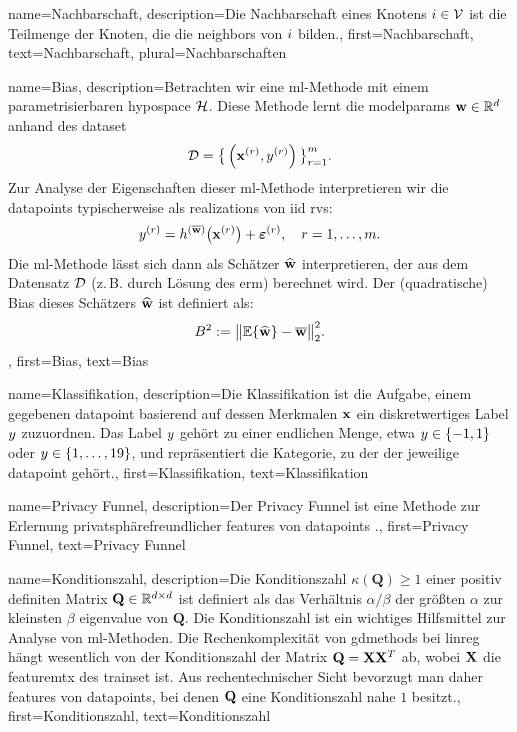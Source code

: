 {{{
{
	name={Nachbarschaft},
	description={Die  Nachbarschaft eines Knotens $i \in \mathcal{V}$ 
		ist die Teilmenge der Knoten, die die \gls{neighbors} von $i$ bilden.},
	first={Nachbarschaft}, text={Nachbarschaft}, plural={Nachbarschaften}
}

{
	name={Bias},
	description={Betrachten wir eine  \gls{ml}-Methode mit einem parametrisierbaren \gls{hypospace} $\mathcal{H}$. 
		Diese Methode lernt die \gls{modelparams} ${\bf w} \in \mathbb{R}^{d}$ anhand des \gls{dataset}
		\[
		\mathcal{D} = \big\{ \left( {\bf x}^{(r)},y^{(r)} \right) \big\}_{r=1}^{m}.
		\]
		Zur Analyse der Eigenschaften dieser \gls{ml}-Methode interpretieren wir die \gls{datapoint}s typischerweise 
		als \gls{realization}s von \gls{iid} \gls{rv}s:
		\[
		y^{(r)} = h^{(\overline{{\bf w}})}\big( {\bf x}^{(r)} \big) + \bm{\varepsilon}^{(r)}, 
		\quad r=1,\ldots,m.
		\]
		Die \gls{ml}-Methode lässt sich dann als Schätzer $\widehat{{\bf w}}$ interpretieren, der aus dem Datensatz $\mathcal{D}$ 
		(z.\,B. durch Lösung des \gls{erm}) berechnet wird. Der (quadratische) Bias dieses Schätzers $\widehat{{\bf w}}$ ist definiert als:
		\[
		B^{2} := \big\| \mathbb{E} \{ \widehat{{\bf w}} \} - \overline{{\bf w}} \big\|_{2}^{2}.
		\]},
	first={Bias}, text={Bias}
}


{
	name={Klassifikation},
	description={Die  Klassifikation ist die Aufgabe, einem gegebenen 
		\gls{datapoint} basierend auf dessen Merkmalen ${\bf x}$ ein diskretwertiges Label $y$ 
		zuzuordnen. Das Label $y$ gehört zu einer endlichen Menge, etwa 
		$y \in \{-1,1\}$ oder $y \in \{1,\ldots,19\}$, und repräsentiert die Kategorie, 
		zu der der jeweilige \gls{datapoint} gehört.},
	first={Klassifikation}, text={Klassifikation}

}

{
	name={Privacy Funnel},
	description={Der  Privacy Funnel ist eine Methode zur Erlernung 
		privatsphärefreundlicher \gls{feature}s von \gls{datapoint}s \cite{PrivacyFunnel}.},
	first={Privacy Funnel}, text={Privacy Funnel}
}

{
	name={Konditionszahl},
	description={Die  Konditionszahl $\kappa(\mathbf{Q}) \geq 1$ einer positiv definiten 
		Matrix $\mathbf{Q} \in \mathbb{R}^{d \times d}$ ist definiert als das Verhältnis 
		$\alpha / \beta$ der größten $\alpha$ zur kleinsten $\beta$ \gls{eigenvalue} von $\mathbf{Q}$. 
		Die Konditionszahl ist ein wichtiges Hilfsmittel zur Analyse von \gls{ml}-Methoden. 
		Die Rechenkomplexität von \gls{gdmethods} bei \gls{linreg} hängt wesentlich von der 
		Konditionszahl der Matrix $\mathbf{Q} = {\bf X} {\bf X}^{T}$ ab, wobei ${\bf X}$ die \gls{featuremtx} 
		des \gls{trainset} ist. Aus rechentechnischer Sicht bevorzugt man daher \gls{feature}s 
		von \gls{datapoint}s, bei denen $\mathbf{Q}$ eine Konditionszahl nahe $1$ besitzt.},
	first={Konditionszahl}, text={Konditionszahl}
}

}}}
